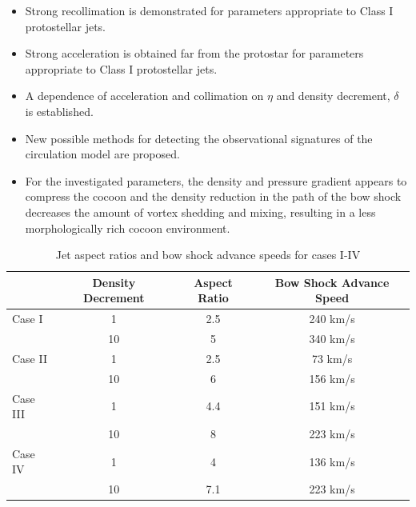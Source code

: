 

\begin{itemize}
\item Strong recollimation is demonstrated for parameters appropriate to Class I protostellar jets.
\item Strong acceleration is obtained far from the protostar for parameters appropriate to Class I protostellar jets.
\item A dependence of acceleration and collimation on $\eta$ and density decrement, $\delta$ is established.
\item New possible methods for detecting the observational signatures of the circulation model are proposed.
\item For the investigated parameters, the density and pressure gradient appears to compress the cocoon and the density reduction in the path of the bow shock decreases the amount of vortex shedding and mixing, resulting in a less morphologically rich cocoon environment.

\end{itemize}

\begin{table}
\begin{center}
\begin{tabular}{l c c c}
\hline
       & Density Decrement  &Aspect Ratio& Bow Shock Advance Speed\\
\hline
\hline
 Case I &  1& 2.5    &  240 km/s\\
  &  10&  5    &  340 km/s\\
\hline
 Case II &1&   2.5    &  73 km/s\\
  &  10& 6    &  156 km/s\\
\hline
 Case III &1&   4.4   &  151 km/s\\
  &  10& 8   &  223 km/s\\
\hline
 Case IV &1&   4    & 136  km/s\\
  & 10&  7.1    &  223 km/s\\
\hline
 \end{tabular}
 \caption{Jet aspect ratios and bow shock advance speeds for cases I-IV}
\label{AspectRatiosandAdvanceSpeeds}
 \end{center}
 \end{table}
